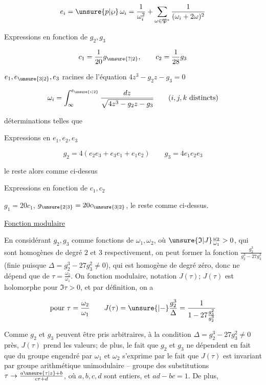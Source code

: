 \[
e_i=\unsure{p|\wp}\,\omega_i=\frac1{\omega_i^2}+\sum_{\omega\in\mathfrak P^{*}}\frac1{(\omega_i+2\omega)^2}
\]

Expressions en fonction de $g_2,g_3$ 

\[
c_1=\frac1{20}g_{\unsure{?|2}},\qquad c_2=\frac1{28}g_3
\]

$e_1,e_{\unsure{3|2}},e_3$ racines de l'équation $4z^3-g_2z-g_3=0$

\[
\omega_i=\int_{\infty}^{e_{\unsure{i|2}}}\frac{dz}{\sqrt{4z^3-g_2z-g_3}}\qquad(i,j,k\ \text{distincts})
\]

déterminations telles que  


Expressions en  $e_1,e_2,e_3$

\[
g_2=4(e_2e_3+e_3e_1+e_1e_2)\qquad g_3=4e_1e_2e_3
\]

le reste alors comme ci-dessus

Expressions en fonction de $c_1,c_2$

$g_1=20c_1$, $g_{\unsure{2|3}}=20c_{\unsure{3|2}}$, le reste comme ci-dessus.

\uline{Fonction modulaire}

En considérant $g_2,g_3$ comme fonctions de $\omega_1,\omega_2$, où $\unsure{\mathfrak I|J}\frac{\omega_2}{\omega_1}>0$, qui sont homogènes de degré $2$ et $3$ respectivement, on peut former la fonction $\frac{g_2^3}{g_2^3-27g_3^2}$ (finie puisque $\Delta=g_2^3-27g_3^2\ne0$), qui est homogène de degré zéro, donc ne dépend que de $\tau=\frac{\omega_2}{\omega_1}$. On  fonction modulaire, notation $J(\tau)$; $J(\tau)$ est holomorphe pour $\mathfrak I\tau>0$, et par définition, on a

\[
\text{pour }\tau=\frac{\omega_2}{\omega_1}\qquad
J(\tau)=\unsure{{}|-}\frac{g_2^3}{\Delta}=\frac1{1-27\frac{g_3^2}{g_2^3}}
\]

Comme $g_2$ et $g_3$ peuvent être pris arbitraires, à  la condition $\Delta=g_2^3-27g_3^2\ne0$ près, $J(\tau)$ prend  les valeurs; de plus, le fait que $g_2$ et $g_3$ ne dépendent en fait que du groupe engendré par $\omega_1$ et $\omega_2$ s'exprime par le fait que $J(\tau)$ est invariant par   groupe arithmétique unimodulaire -- groupe des substitutions $\tau\to\frac{a\unsure{\tau|z}+b}{c\tau+d}$, où $a,b,c,d$ sont entiers, et $ad-bc=1$. De plus,

